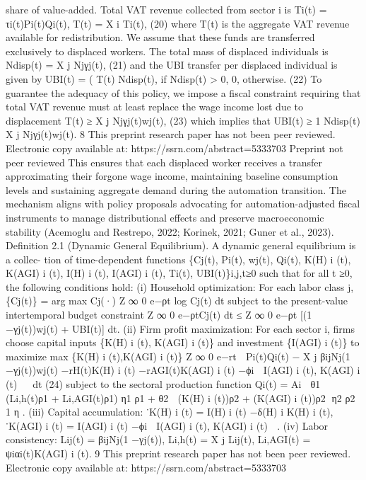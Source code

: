share of value-added. Total VAT revenue collected from sector i is
Ti(t) = τi(t)Pi(t)Qi(t),
T(t) =
X
i
Ti(t),
(20)
where T(t) is the aggregate VAT revenue available for redistribution. We assume that these
funds are transferred exclusively to displaced workers. The total mass of displaced individuals
is
Ndisp(t) =
X
j
Njγj(t),
(21)
and the UBI transfer per displaced individual is given by
UBI(t) =
(
T(t)
Ndisp(t),
if Ndisp(t) > 0,
0,
otherwise.
(22)
To guarantee the adequacy of this policy, we impose a fiscal constraint requiring that total
VAT revenue must at least replace the wage income lost due to displacement
T(t) ≥
X
j
Njγj(t)wj(t),
(23)
which implies that
UBI(t) ≥
1
Ndisp(t)
X
j
Njγj(t)wj(t).
8
This preprint research paper has not been peer reviewed. Electronic copy available at: https://ssrn.com/abstract=5333703
Preprint not peer reviewed
This ensures that each displaced worker receives a transfer approximating their forgone
wage income, maintaining baseline consumption levels and sustaining aggregate demand
during the automation transition. The mechanism aligns with policy proposals advocating
for automation-adjusted fiscal instruments to manage distributional effects and preserve
macroeconomic stability (Acemoglu and Restrepo, 2022; Korinek, 2021; Guner et al., 2023).
Definition 2.1 (Dynamic General Equilibrium). A dynamic general equilibrium is a collec-
tion of time-dependent functions
\{Cj(t), Pi(t), wj(t), Qi(t), K(H)
i
(t), K(AGI)
i
(t), I(H)
i
(t), I(AGI)
i
(t), Ti(t), UBI(t)\}i,j,t≥0
such that for all t ≥0, the following conditions hold:
(i) Household optimization: For each labor class j,
\{Cj(t)\} = arg max
Cj(·)
Z ∞
0
e−ρt log Cj(t) dt
subject to the present-value intertemporal budget constraint
Z ∞
0
e−ρtCj(t) dt ≤
Z ∞
0
e−ρt [(1 −γj(t))wj(t) + UBI(t)] dt.
(ii) Firm profit maximization: For each sector i, firms choose capital inputs \{K(H)
i
(t), K(AGI)
i
(t)\}
and investment \{I(AGI)
i
(t)\} to maximize
max
\{K(H)
i
(t),K(AGI)
i
(t)\}
Z ∞
0
e−rt

Pi(t)Qi(t) −
X
j
βijNj(1 −γj(t))wj(t)
−rH(t)K(H)
i
(t) −rAGI(t)K(AGI)
i
(t) −ϕi

I(AGI)
i
(t), K(AGI)
i
(t)
 
dt
(24)
subject to the sectoral production function
Qi(t) = Ai

θ1 (Li,h(t)ρ1 + Li,AGI(t)ρ1)
η1
ρ1 + θ2

(K(H)
i
(t))ρ2 + (K(AGI)
i
(t))ρ2 η2
ρ2
 1
η
.
(iii) Capital accumulation:
˙K(H)
i
(t) = I(H)
i
(t) −δ(H)
i
K(H)
i
(t),
˙K(AGI)
i
(t) = I(AGI)
i
(t) −ϕi

I(AGI)
i
(t), K(AGI)
i
(t)

.
(iv) Labor consistency:
Lij(t) = βijNj(1 −γj(t)),
Li,h(t) =
X
j
Lij(t),
Li,AGI(t) = ψiαi(t)K(AGI)
i
(t).
9
This preprint research paper has not been peer reviewed. Electronic copy available at: https://ssrn.com/abstract=5333703
